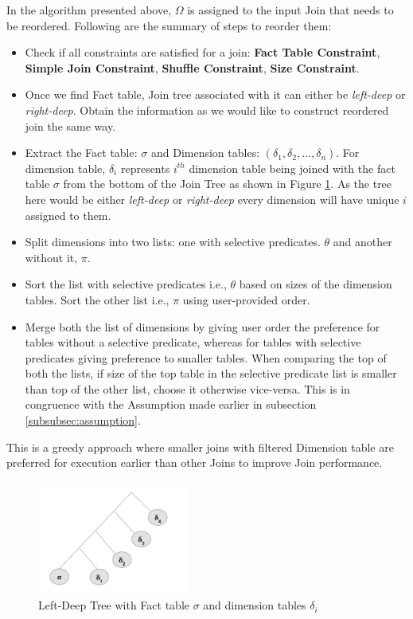 In the algorithm presented above, $\Omega$ is assigned to the input Join that needs to be reordered. Following are the summary of steps to reorder them:
\begin{itemize}
\item Check if all constraints are satisfied for a join: \textbf{Fact Table Constraint}, \textbf{Simple Join Constraint}, \textbf{Shuffle Constraint}, \textbf{Size Constraint}.
\item Once we find Fact table, Join tree associated with it can either be \textit{left-deep} or \textit{right-deep}. Obtain the information as we would like to construct reordered join the same way.
\item Extract the Fact table: $\sigma$ and Dimension tables: $ (\delta_1, \delta_2, \ldots, \delta_n)$. For dimension table, $\delta_i$ represents  $i^{th}$ dimension table being joined with the fact table $\sigma$ from the bottom of the Join Tree as shown in Figure \ref{left-deep}. As the tree here would be either \textit{left-deep} or \textit{right-deep} every dimension will have unique $i$ assigned to them.
\item Split dimensions into two lists: one with selective predicates. $\theta$ and another without it, $\pi$.
\item Sort the list with selective predicates i.e., $\theta$ based on sizes of the dimension tables. Sort the other list i.e., $\pi$ using user-provided order.
\item Merge both the list of dimensions by giving user order the preference for tables without a selective predicate, whereas for tables with selective predicates giving preference to smaller tables. When comparing the top of both the lists, if size of the top table in the selective predicate list is smaller than top of the other list, choose it otherwise vice-versa. This is in congruence with the Assumption made earlier in subsection \ref{subsubsec:assumption}.
\end{itemize}

This is a greedy approach where smaller joins with filtered Dimension table are preferred for execution earlier than other Joins to improve Join performance.

\begin{figure}[ht]
\centerline{\includegraphics[width=5cm]{fig/left-deep.png}}
\caption{Left-Deep Tree with Fact table $\sigma$ and dimension tables $\delta_i$}
\label{left-deep}
\end{figure}

